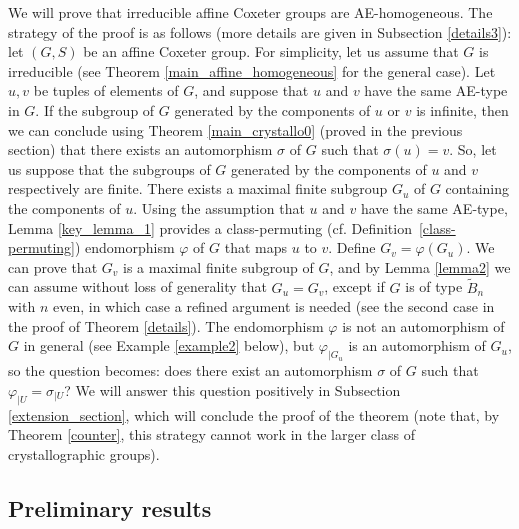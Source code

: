 \documentclass[a4paper, 11pt]{amsart}
\theoremstyle{definition}
\theoremstyle{remark}
\begin{document}
We will prove that irreducible affine Coxeter groups are AE-homogeneous. The strategy of the proof is as follows (more details are given in Subsection \ref{details3}): let $(G,S)$ be an affine Coxeter group. For simplicity, let us assume that $G$ is irreducible (see Theorem \ref{main_affine_homogeneous} for the general case). Let $u,v$ be tuples of elements of $G$, and suppose that $u$ and $v$ have the same AE-type in $G$. If the subgroup of $G$ generated by the components of $u$ or $v$ is infinite, then we can conclude using Theorem \ref{main_crystallo0} (proved in the previous section) that there exists an automorphism $\sigma$ of $G$ such that $\sigma(u)=v$. So, let us suppose that the subgroups of $G$ generated by the components of $u$ and $v$ respectively are finite. There exists a maximal finite subgroup $G_u$ of $G$ containing the components of $u$. Using the assumption that $u$ and $v$ have the same AE-type, Lemma \ref{key_lemma_1} provides a class-permuting (cf. Definition~\ref{class-permuting}) endomorphism $\varphi$ of $G$ that maps $u$ to $v$. Define $G_v=\varphi(G_u)$. We can prove that $G_v$ is a maximal finite subgroup of $G$, and by Lemma \ref{lemma2} we can assume without loss of generality that $G_u=G_v$, except if $G$ is of type $\tilde{B}_n$ with $n$ even, in which case a refined argument is needed (see the second case in the proof of Theorem \ref{details}). The endomorphism $\varphi$ is not an automorphism of $G$ in general (see Example \ref{example2} below), but $\varphi_{\vert G_u}$ is an automorphism of $G_u$, so the question becomes: does there exist an automorphism $\sigma$ of $G$ such that $\varphi_{\vert U}=\sigma_{\vert U}$? We will answer this question positively in Subsection \ref{extension_section}, which will conclude the proof of the theorem (note that, by Theorem \ref{counter}, this strategy cannot work in the larger class of crystallographic groups).


\subsection{Preliminary results}
\end{document}
